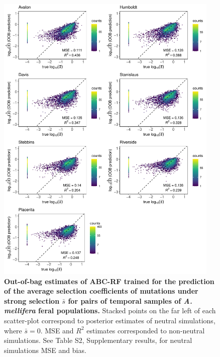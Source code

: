 \documentclass[a4paper, 12pt]{article}
\begin{document}
\begin{figure}[ht]
  \centering
  \includegraphics[width=0.95\textwidth]{Figures/FigureS20_combined_plot_gammasel.pdf}
  \small\caption{\textbf{Out-of-bag estimates of ABC-RF trained for the prediction of the average selection coefficients of mutations under strong selection $\bar{s}$ for pairs of temporal samples of \textit{A. mellifera} feral populations.} Stacked points on the far left of each scatter-plot correspond to posterior estimates of neutral simulations, where $\bar{s} = 0$. MSE and $R^2$ estimates corresponded to non-neutral simulations. See Table S2, Supplementary results, for neutral simulations MSE and bias.}
  \label{fig:supple_feralbee_gammaselmean}
\end{figure}
\end{document}
